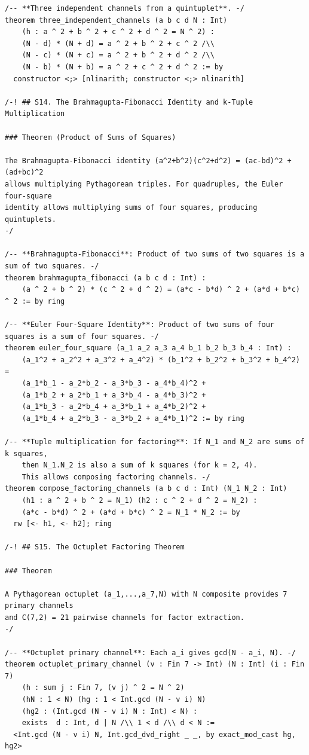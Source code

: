 \documentclass[11pt,openright,twoside]{book}
\theoremstyle{definition}
\begin{document}
\begin{lstlisting}[style=lean]
/-- **Three independent channels from a quintuplet**. -/
theorem three_independent_channels (a b c d N : Int)
    (h : a ^ 2 + b ^ 2 + c ^ 2 + d ^ 2 = N ^ 2) :
    (N - d) * (N + d) = a ^ 2 + b ^ 2 + c ^ 2 /\\
    (N - c) * (N + c) = a ^ 2 + b ^ 2 + d ^ 2 /\\
    (N - b) * (N + b) = a ^ 2 + c ^ 2 + d ^ 2 := by
  constructor <;> [nlinarith; constructor <;> nlinarith]

/-! ## S14. The Brahmagupta-Fibonacci Identity and k-Tuple Multiplication

### Theorem (Product of Sums of Squares)

The Brahmagupta-Fibonacci identity (a^2+b^2)(c^2+d^2) = (ac-bd)^2 + (ad+bc)^2
allows multiplying Pythagorean triples. For quadruples, the Euler four-square
identity allows multiplying sums of four squares, producing quintuplets.
-/

/-- **Brahmagupta-Fibonacci**: Product of two sums of two squares is a sum of two squares. -/
theorem brahmagupta_fibonacci (a b c d : Int) :
    (a ^ 2 + b ^ 2) * (c ^ 2 + d ^ 2) = (a*c - b*d) ^ 2 + (a*d + b*c) ^ 2 := by ring

/-- **Euler Four-Square Identity**: Product of two sums of four squares is a sum of four squares. -/
theorem euler_four_square (a_1 a_2 a_3 a_4 b_1 b_2 b_3 b_4 : Int) :
    (a_1^2 + a_2^2 + a_3^2 + a_4^2) * (b_1^2 + b_2^2 + b_3^2 + b_4^2) =
    (a_1*b_1 - a_2*b_2 - a_3*b_3 - a_4*b_4)^2 +
    (a_1*b_2 + a_2*b_1 + a_3*b_4 - a_4*b_3)^2 +
    (a_1*b_3 - a_2*b_4 + a_3*b_1 + a_4*b_2)^2 +
    (a_1*b_4 + a_2*b_3 - a_3*b_2 + a_4*b_1)^2 := by ring

/-- **Tuple multiplication for factoring**: If N_1 and N_2 are sums of k squares,
    then N_1.N_2 is also a sum of k squares (for k = 2, 4).
    This allows composing factoring channels. -/
theorem compose_factoring_channels (a b c d : Int) (N_1 N_2 : Int)
    (h1 : a ^ 2 + b ^ 2 = N_1) (h2 : c ^ 2 + d ^ 2 = N_2) :
    (a*c - b*d) ^ 2 + (a*d + b*c) ^ 2 = N_1 * N_2 := by
  rw [<- h1, <- h2]; ring

/-! ## S15. The Octuplet Factoring Theorem

### Theorem

A Pythagorean octuplet (a_1,...,a_7,N) with N composite provides 7 primary channels
and C(7,2) = 21 pairwise channels for factor extraction.
-/

/-- **Octuplet primary channel**: Each a_i gives gcd(N - a_i, N). -/
theorem octuplet_primary_channel (v : Fin 7 -> Int) (N : Int) (i : Fin 7)
    (h : sum j : Fin 7, (v j) ^ 2 = N ^ 2)
    (hN : 1 < N) (hg : 1 < Int.gcd (N - v i) N)
    (hg2 : (Int.gcd (N - v i) N : Int) < N) :
    exists  d : Int, d | N /\\ 1 < d /\\ d < N :=
  <Int.gcd (N - v i) N, Int.gcd_dvd_right _ _, by exact_mod_cast hg, hg2>


\end{lstlisting}
\end{document}
